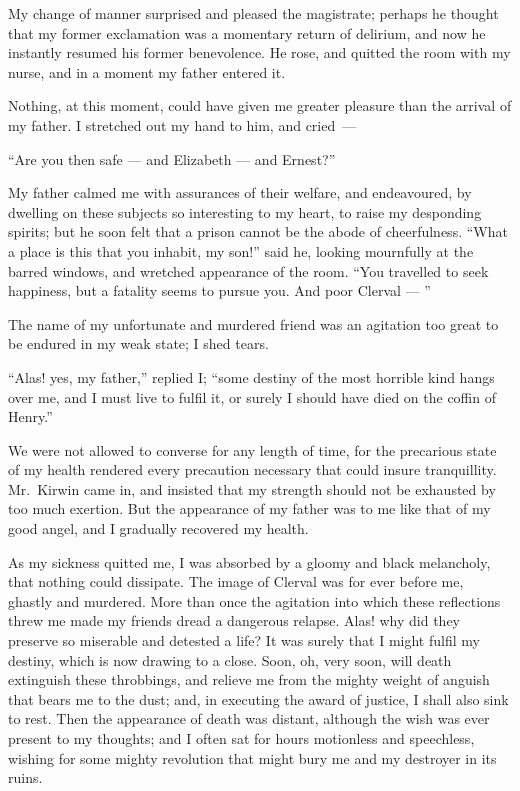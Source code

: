 My change of manner surprised and
pleased the magistrate; perhaps he
thought that my former exclamation
was a momentary return of delirium,
and now he instantly resumed his
former benevolence. He rose, and
quitted the room with my nurse, and
in a moment my father entered it.

Nothing, at this moment, could have
given me greater pleasure than the arrival
of my father. I stretched out my
hand to him, and cried~---

``Are you then safe --- and Elizabeth --- and
Ernest?''

My father calmed me with assurances
of their welfare, and endeavoured, by
dwelling on these subjects so interesting
to my heart, to raise my desponding
spirits; but he soon felt that a prison
cannot be the abode of cheerfulness.
``What a place is this that you inhabit,
my son!'' said he, looking mournfully
at the barred windows, and wretched
appearance of the room. ``You travelled
to seek happiness, but a fatality
seems to pursue you. And poor Clerval --- ''

The name of my unfortunate and
murdered friend was an agitation too
great to be endured in my weak state;
I shed tears.

``Alas! yes, my father,'' replied I;
``some destiny of the most horrible
kind hangs over me, and I must live to
fulfil it, or surely I should have died on
the coffin of Henry.''

We were not allowed to converse for
any length of time, for the precarious
state of my health rendered every precaution
necessary that could insure
tranquillity. Mr.~Kirwin came in, and
insisted that my strength should not be
exhausted by too much exertion. But
the appearance of my father was to me
like that of my good angel, and I gradually
recovered my health.

As my sickness quitted me, I was absorbed
by a gloomy and black melancholy,
that nothing could dissipate.
The image of Clerval was for ever
before me, ghastly and murdered.
More than once the agitation into
which these reflections threw me made
my friends dread a dangerous relapse.
Alas! why did they preserve so miserable
and detested a life? It was surely
that I might fulfil my destiny, which is
now drawing to a close. Soon, oh, very
soon, will death extinguish these throbbings,
and relieve me from the mighty
weight of anguish that bears me to the
dust; and, in executing the award of
justice, I shall also sink to rest. Then
the appearance of death was distant,
although the wish was ever present to
my thoughts; and I often sat for hours
motionless and speechless, wishing for
some mighty revolution that might
bury me and my destroyer in its
ruins.

